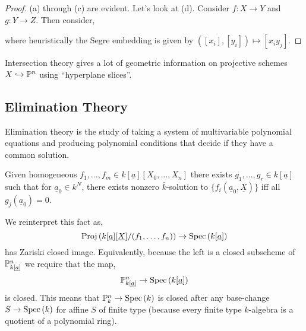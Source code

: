 \documentclass[12pt]{article}
\begin{document}
\begin{proof}
(a) through (c) are evident. Let's look at (d). Consider $f : X \to Y$ and $g : Y \to Z$. Then consider,
\begin{center}
\end{center}
where heuristically the Segre embedding is given by $([x_i], [y_i]) \mapsto [x_i y_j]$.
\end{proof}

\begin{rmk}
Intersection theory gives a lot of geometric information on projective schemes $X \embed \P^n$ using ``hyperplane slices''. 
\end{rmk}

\subsection{Elimination Theory}

\begin{rmk}
Elimination theory is the study of taking a system of multivariable polynomial equations and producing polynomial conditions that decide if they have a common solution.
\end{rmk}

\begin{thm}
Given homogeneous $f_1, \dots, f_m \in k[\underline{a}][X_0, \dots, X_n]$ there exists $g_1, \dots, g_r \in k[\underline{a}]$ such that for $\underline{a}_0 \in k^N$, there exists nonzero $\bar{k}$-solution to $\{ f_i(\underline{a}_0, \underline{X}) \}$ iff all $g_j(\underline{a}_0) = 0$.
\end{thm}

\begin{rmk}
We reinterpret this fact as,
\[ \Proj{k[\underline{a}][\underline{X}]/(f_1, \dots, f_n)} \to \Spec{k[\underline{a}]} \]
has Zariski closed image. Equivalently, because the left is a closed subscheme of $\P^n_{k[\underline{a}]}$ we require that the map,
\[ \P^n_{k[\underline{a}]} \to \Spec{k[\underline{a}]} \]
is closed. This means that $\P^n_k \to \Spec{k}$ is closed after any base-change $S \to \Spec{k}$ for affine $S$ of finite type (because every finite type $k$-algebra is a quotient of a polynomial ring).
\end{rmk}
\end{document}
